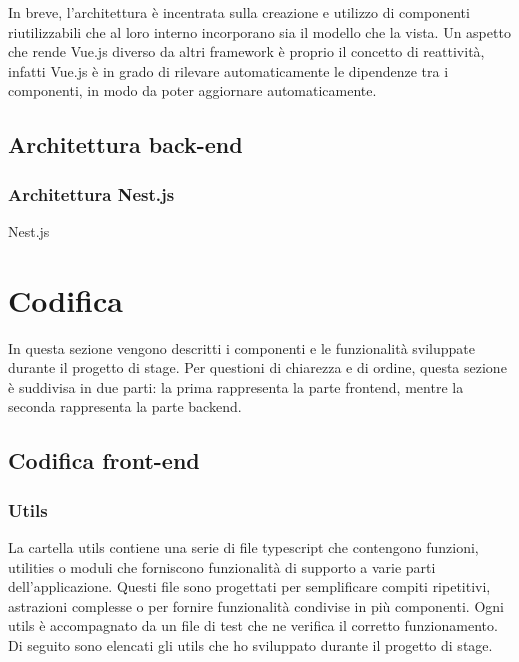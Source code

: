 In breve, l'architettura è incentrata sulla creazione e utilizzo di componenti riutilizzabili che al loro interno incorporano sia il modello che la vista. Un aspetto che rende Vue.js
diverso da altri framework è proprio il concetto di reattività, infatti Vue.js è in grado di rilevare automaticamente le dipendenze tra i componenti, in modo da poter aggiornare automaticamente.

\subsection{Architettura back-end}\label{subsec:architettura-back-end}
\subsubsection{Architettura Nest.js}\label{subsubsec:architettura-nest.js}
Nest.js 


\section{Codifica}
In questa sezione vengono descritti i componenti e le funzionalità sviluppate durante il progetto di stage. 
Per questioni di chiarezza e di ordine, questa sezione è suddivisa in due parti: la prima rappresenta la parte frontend, mentre la seconda rappresenta la parte backend.
\subsection{Codifica front-end}\label{subsec:codifica-front-end}

\subsubsection{Utils}\label{subsubsec:utils}
La cartella utils contiene una serie di file typescript che contengono funzioni, utilities o moduli che forniscono funzionalità di supporto a varie parti dell'applicazione.
Questi file sono progettati per semplificare compiti ripetitivi, astrazioni complesse o per fornire funzionalità condivise in più componenti. Ogni utils è accompagnato 
da un file di test che ne verifica il corretto funzionamento.\\
Di seguito sono elencati gli utils che ho sviluppato durante il progetto di stage.

